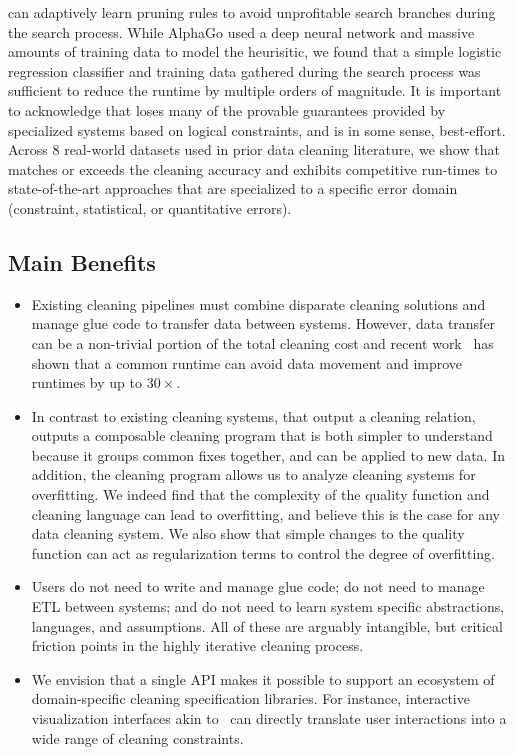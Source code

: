 \sys can adaptively learn pruning rules to avoid unprofitable search branches during the search process.
While AlphaGo used a deep neural network and massive amounts of training data to model the heurisitic, we found that a simple logistic regression classifier and training data gathered during the search process was sufficient to reduce the runtime by multiple orders of magnitude. 
It is important to acknowledge that \sys loses many of the provable guarantees provided by specialized systems based on logical constraints, and is in some sense, best-effort.  
Across 8 real-world datasets used in prior data cleaning literature, we show that \sys matches or exceeds the cleaning accuracy and exhibits competitive run-times to state-of-the-art approaches that are specialized to a specific error domain (constraint, statistical, or quantitative errors).  

\subsection{Main Benefits}
\begin{itemize}[leftmargin=*, topsep=0mm, itemsep=0mm]
\item {} Existing cleaning pipelines must combine disparate cleaning solutions and manage glue code to transfer data between systems.  However, data transfer can be a non-trivial portion of the total cleaning cost and recent work~\cite{palkar2017weld} has shown that a common runtime can avoid data movement and improve runtimes by up to $30\times$.  

\item {} In contrast to existing cleaning systems, that output a cleaning relation, \sys outputs a composable cleaning program that is both simpler to understand because it groups common fixes together, and can be applied to new data.  In addition, the cleaning program allows us to analyze cleaning systems for overfitting.  We indeed find that the complexity of the quality function and cleaning language can lead to overfitting, and believe this is the case for any data cleaning system.  We also show that simple changes to the quality function can act as regularization terms to control the degree of overfitting.

\item {}  Users do not need to write and manage glue code; do not need to manage ETL between systems; and do not need to learn system specific abstractions, languages, and assumptions.  All of these are arguably intangible, but critical friction points in the highly iterative cleaning process.  

\item {} We envision that a single API makes it possible to support an ecosystem of domain-specific cleaning specification libraries.  For instance,  interactive visualization interfaces akin to~\cite{trifacta,kandel2011wrangler,DBLP:journals/pvldb/0002M13,wu2012demonstration} can directly translate user interactions into a wide range of cleaning constraints.   
\end{itemize}




